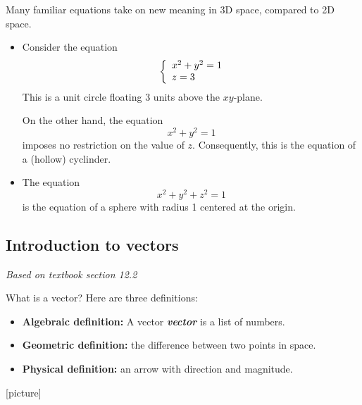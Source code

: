 \documentclass[10pt]{article}
\DeclareRobustCommand{\demph}[1]{%
  \ifmmode
  {\color{Blue}#1}%
  \else
  {\color{Blue}\bfseries\slshape #1}%
  \fi
}
\theoremstyle{definition}
\newcommand{\1}[1]{\textbf{1}_{\left[#1\right]}} %
\begin{document}
Many familiar equations take on new meaning in 3D space, compared to 2D space.

\begin{itemize}
  \item Consider the equation
  \begin{equation*}
    \left\{ \begin{array}{l@{}l} x^{2}+y^{2} =1 \\ z=3 \end{array}\right.
  \end{equation*}
  This is a unit circle floating 3 units above the $xy$-plane.

  On the other hand, the equation
  \begin{equation*}
    x^{2}+y^{2}=1
  \end{equation*}
  imposes no restriction on the value of $z$. Consequently, this is the equation of a (hollow) cyclinder.

  \item The equation
  \begin{equation*}
    x^{2}+y^{2}+z^{2}=1
  \end{equation*}
  is the equation of a sphere with radius 1 centered at the origin.

\end{itemize}


\subsection{Introduction to vectors}
\textit{Based on textbook section 12.2}

What is a vector? Here are three definitions:

\begin{itemize}
  \item \textbf{Algebraic definition:} A \demph{vector} is a list of numbers.
  \item \textbf{Geometric definition:} the difference between two points in space.
  \item \textbf{Physical definition:} an arrow with direction and magnitude.
\end{itemize}

[picture]
\end{document}
